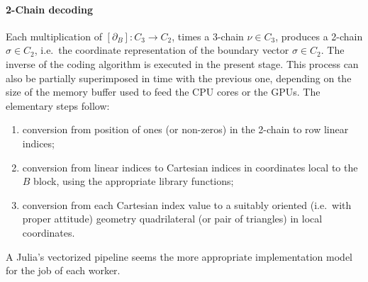 \paragraph{2-Chain decoding} 
Each multiplication of $[\partial_B] : C_3 \to C_2$, times a 3-chain $\nu\in C_3$, produces a 2-chain  $\sigma\in C_2$, i.e.~the coordinate representation of the boundary vector $\sigma\in C_2$.  The inverse of the coding algorithm is executed in the present stage.  This process can also be partially superimposed in time with the previous one, depending on the size of the memory buffer used to feed the CPU cores or the GPUs. The elementary steps follow:

\begin{enumerate}

\item conversion from position of ones (or non-zeros) in the 2-chain to row linear indices;

\item conversion from linear indices to Cartesian indices in coordinates local to the $B$ block, using the appropriate library functions;

\item conversion from each Cartesian index value to a suitably oriented (i.e.~with proper attitude) geometry quadrilateral (or pair of triangles) in local coordinates.

\end{enumerate}

A Julia's vectorized pipeline seems the more appropriate implementation model for the job of each worker.

